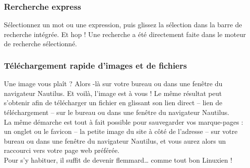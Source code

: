 \subsubsection{Rercherche express}
Sélectionnez un mot ou une expression, puis glissez la sélection dans la barre de recherche intégrée. Et hop ! Une recherche a été directement faite dans le moteur de recherche sélectionné.
\subsubsection{Téléchargement rapide d'images et de fichiers}
Une image vous plaît ? Alors -là sur votre bureau ou dans une fenêtre du navigateur Nautilus. Et voilà, l'image est à vous ! Le  même résultat peut s'obtenir afin de télécharger un fichier en glissant son lien direct -- lien de téléchargement -- sur le bureau ou dans une fenêtre du navigateur Nautilus.\\
La même démarche est tout à fait possible pour sauvegarder vos marque-pages :  un onglet ou le favicon -- la petite image du site à côté de l'adresse  -- sur votre bureau ou dans une fenêtre du navigateur Nautilus, et vous aurez alors un raccourci vers votre page web préférée.\\
Pour s'y habituer, il suffit de devenir flemmard\ldots{} comme tout bon Linuxien !

